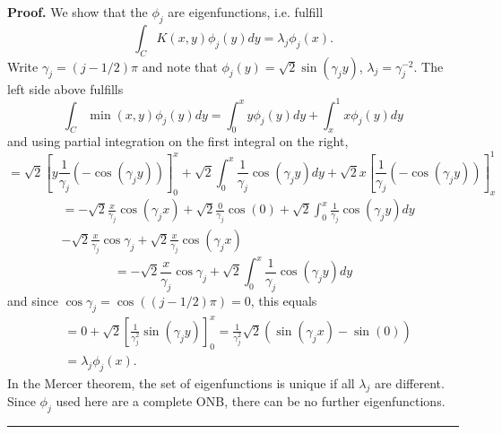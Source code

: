 \documentclass[11pt,twoside]{article}%
\theoremstyle{change}
\newenvironment{proof}[1][Proof]{\textbf{#1.} }{\ \rule{0.5em}{0.5em}}
\begin{document}
\begin{proof}
We show that the $\phi_{j}$ are eigenfunctions, i.e. fulfill
\[
\int_{C}K(x,y)\phi_{j}(y)dy=\lambda_{j}\phi_{j}(x).
\]
Write $\gamma_{j}=\left(  j-1/2\right)  \pi$ and note that $\phi_{j}%
(y)=\sqrt{2}\sin\left(  \gamma_{j}y\right)  $, $\lambda_{j}=\gamma_{j}^{-2}$.
The left side above fulfills
\[
\int_{C}\min(x,y)\phi_{j}(y)dy=\int_{0}^{x}y\phi_{j}(y)dy+\int_{x}^{1}%
x\phi_{j}(y)dy
\]
and using partial integration on the first integral on the right,%
\[
=\sqrt{2}\left[  y\frac{1}{\gamma_{j}}\left(  -\cos\left(  \gamma_{j}y\right)
\right)  \right]  _{0}^{x}+\sqrt{2}\int_{0}^{x}\frac{1}{\gamma_{j}}\cos\left(
\gamma_{j}y\right)  dy+\sqrt{2}x\left[  \frac{1}{\gamma_{j}}\left(
-\cos\left(  \gamma_{j}y\right)  \right)  \right]  _{x}^{1}%
\]%
\begin{align*}
& =-\sqrt{2}\frac{x}{\gamma_{j}}\cos\left(  \gamma_{j}x\right)  +\sqrt{2}%
\frac{0}{\gamma_{j}}\cos\left(  0\right)  +\sqrt{2}\int_{0}^{x}\frac{1}%
{\gamma_{j}}\cos\left(  \gamma_{j}y\right)  dy\\
& -\sqrt{2}\frac{x}{\gamma_{j}}\cos\gamma_{j}+\sqrt{2}\frac{x}{\gamma_{j}}%
\cos\left(  \gamma_{j}x\right)
\end{align*}%
\[
=-\sqrt{2}\frac{x}{\gamma_{j}}\cos\gamma_{j}+\sqrt{2}\int_{0}^{x}\frac
{1}{\gamma_{j}}\cos\left(  \gamma_{j}y\right)  dy
\]
and since $\cos\gamma_{j}=\cos\left(  \left(  j-1/2\right)  \pi\right)  =0$,
this equals
\begin{align*}
& =0+\sqrt{2}\left[  \frac{1}{\gamma_{j}^{2}}\sin\left(  \gamma_{j}y\right)
\right]  _{0}^{x}=\frac{1}{\gamma_{j}^{2}}\sqrt{2}\left(  \sin\left(
\gamma_{j}x\right)  -\sin\left(  0\right)  \right) \\
& =\lambda_{j}\phi_{j}(x).
\end{align*}
In the Mercer theorem, the set of eigenfunctions is unique if all $\lambda
_{j}$ are different. Since $\phi_{j}$ used here are a complete ONB, there can
be no further eigenfunctions.
\end{proof}
\end{document}

